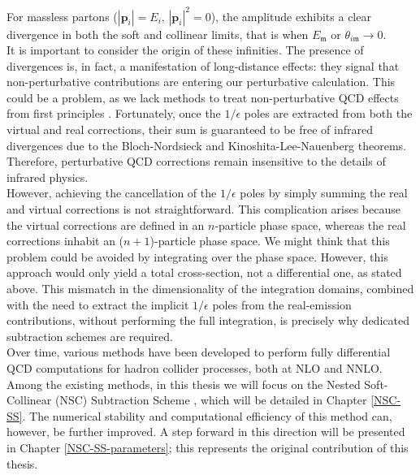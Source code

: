 \documentclass[a4paper, 12pt]{book}
\newcommand{\um}{\mathfrak{m}}
\begin{document}
For massless partons ($|\mathbf{p}_i|=E_i, \, |\mathbf{p}_i|^2=0$), the amplitude exhibits a clear divergence in both the soft and collinear limits, that is when $E_\um$ or $\theta_{i \um} \to 0$.\\
It is important to consider the origin of these infinities. The presence of divergences is, in fact, a manifestation of long-distance effects: they signal that non-perturbative contributions are entering our perturbative calculation. This could be a problem, as we lack methods to treat non-perturbative QCD effects from first principles \cite{Melnikov2018}. Fortunately, once the $1/\epsilon$ poles are extracted from both the virtual and real corrections, their sum is guaranteed to be free of infrared divergences due to the Bloch-Nordsieck \cite{PhysRev.52.54} and Kinoshita-Lee-Nauenberg theorems. Therefore, perturbative QCD corrections remain insensitive to the details of infrared physics. \\
However, achieving the cancellation of the $1/\epsilon$ poles by simply summing the real and virtual corrections is not straightforward. This complication arises because the virtual corrections are defined in an $n$-particle phase space, whereas the real corrections inhabit an ($n+1$)-particle phase space. We might think that this problem could be avoided by integrating over the phase space. However, this approach would only yield a total cross-section, not a differential one, as stated above. This mismatch in the dimensionality of the integration domains, combined with the need to extract the implicit $1/\epsilon$ poles from the real-emission contributions, without performing the full integration, is precisely why dedicated subtraction schemes are required. \\
Over time, various methods have been developed to perform fully differential QCD computations for hadron collider processes, both at NLO and NNLO. Among the existing methods, in this thesis we will focus on the Nested Soft-Collinear (NSC) Subtraction Scheme \cite{Caola:2017dug}, which will be detailed in Chapter \ref{NSC-SS}. The numerical stability and computational efficiency of this method can, however, be further improved. A step forward in this direction will be presented in Chapter \ref{NSC-SS-parameters}; this represents the original contribution of this thesis. 


\clearpage
\end{document}
